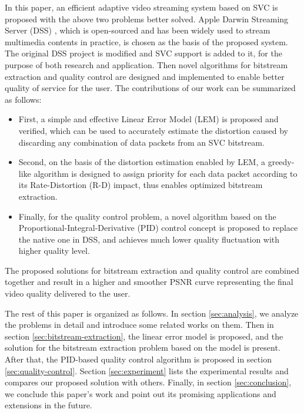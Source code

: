 \documentclass[journal]{IEEEtran}
\begin{document}
In this paper, an efficient adaptive video streaming system based on SVC is proposed with the above two problems better solved. Apple Darwin Streaming Server (DSS) \cite{DSS}, which is open-sourced and has been widely used to stream multimedia contents in practice, is chosen as the basis of the proposed system. The original DSS project is modified and SVC support is added to it, for the purpose of both research and application. Then novel algorithms for bitstream extraction and quality control are designed and implemented to enable better quality of service for the user. The contributions of our work can be summarized as follows:
\begin{itemize}
\item First, a simple and effective Linear Error Model (LEM) is proposed and verified, which can be used to accurately estimate the distortion caused by discarding any combination of data packets from an SVC bitstream.
\item Second, on the basis of the distortion estimation enabled by LEM, a greedy-like algorithm is designed to assign priority for each data packet according to its Rate-Distortion (R-D) impact, thus enables optimized bitstream extraction.
\item Finally, for the quality control problem, a novel algorithm based on the Proportional-Integral-Derivative (PID) control concept is proposed to replace the native one in DSS, and achieves much lower quality fluctuation with higher quality level.
\end{itemize}

The proposed solutions for bitstream extraction and quality control are combined together and result in a higher and smoother PSNR curve representing the final video quality delivered to the user.

The rest of this paper is organized as follows. In section \ref{sec:analysis}, we analyze the problems in detail and introduce some related works on them. Then in section \ref{sec:bitstream-extraction}, the linear error model is proposed, and the solution for the bitstream extraction problem based on the model is present. After that, the PID-based quality control algorithm is proposed in section \ref{sec:quality-control}. Section \ref{sec:experiment} lists the experimental results and compares our proposed solution with others. Finally, in section \ref{sec:conclusion}, we conclude this paper's work and point out its promising applications and extensions in the future.


\end{document}
